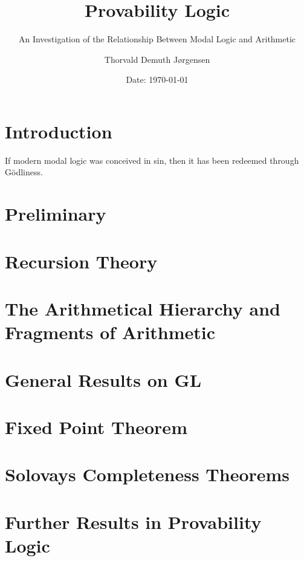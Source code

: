 \documentclass[12pt,a4paper,dvipsnames,bibliography=totocnumbered]{scrbook}
\author{Thorvald Demuth Jørgensen}
\title{Provability Logic}
\subtitle{An Investigation of the Relationship Between Modal Logic and
Arithmetic}
\date{Date: {\today}}
\theoremstyle{dotlessS}
\theoremstyle{dotlessS}
\theoremstyle{dotlessS}
\theoremstyle{dotlessS}
\theoremstyle{dotlessS}
\theoremstyle{dotlessS}
\theoremstyle{dotlessS}
\newcommand{\0}{\overline{0}}
\newcommand{\1}{\raisebox{\dimexpr1.79ex- \height}{$1$}}
\begin{document}
\maketitle
\tableofcontents
\newpage


\chapter{Introduction}
\epigraph{If modern modal logic was conceived in sin, then it has been redeemed
through Gödliness.}{\parencite[Page 1]{Boolos1979}}
\label{chap:intro}


\chapter{Preliminary}
\label{chap:Pre}


\chapter{Recursion Theory}
\label{chap:Recur}


\chapter{The Arithmetical Hierarchy and Fragments of Arithmetic}
\label{chap:PRA}


\chapter{General Results on GL}
\label{chap:GL}


\chapter{Fixed Point Theorem}
\label{chap:Fixed}


\chapter{Solovays Completeness Theorems}
\label{chap:Complete}


\chapter{Further Results in Provability Logic}
\label{chap:Further}


\nocite{*}
\printbibliography

%
\end{document}
